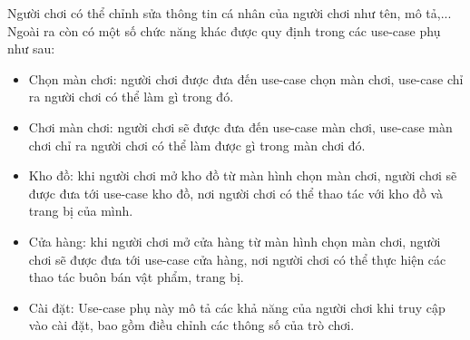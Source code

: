 \hspace*{0.5cm} Người chơi có thể chỉnh sửa thông tin cá nhân của người chơi như tên, mô tả,... Ngoài ra còn có một số chức năng khác được quy định trong các use-case phụ như sau:
\begin{itemize}
	\item Chọn màn chơi: người chơi được đưa đến use-case chọn màn chơi, use-case chỉ ra người chơi có thể làm gì trong đó.
	\item Chơi màn chơi: người chơi sẽ được đưa đến use-case màn chơi, use-case màn chơi chỉ ra người chơi có thể làm được gì trong màn chơi đó.
	\item Kho đồ: khi người chơi mở kho đồ từ màn hình chọn màn chơi, người chơi sẽ được đưa tới use-case kho đồ, nơi người chơi có thể thao tác với kho đồ và trang bị của mình.
	\item Cửa hàng: khi người chơi mở cửa hàng từ màn hình chọn màn chơi, người chơi sẽ được đưa tới use-case cửa hàng, nơi người chơi có thể thực hiện các thao tác buôn bán vật phẩm, trang bị.
	\item Cài đặt: Use-case phụ này mô tả các khả năng của người chơi khi truy cập vào cài đặt, bao gồm điều chỉnh các thông số của trò chơi.
\end{itemize}


